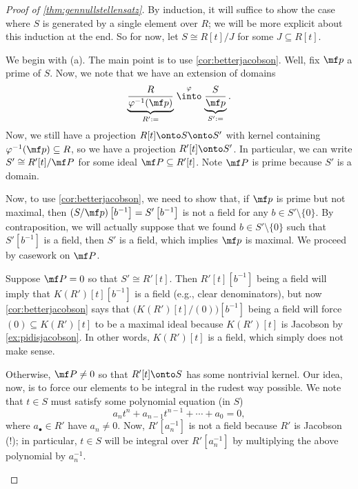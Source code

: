 \begin{proof}[Proof of \autoref{thm:gennullstellensatz}]
	By induction, it will suffice to show the case where $S$ is generated by a single element over $R$; we will be more explicit about this induction at the end.
	So for now, let $S\cong R[t]/J$ for some $J\subseteq R[t]$.

	We begin with (a). The main point is to use \autoref{cor:betterjacobson}. Well, fix $\mf p$ a prime of $S$. Now, we note that we have an extension of domains
	\[\underbrace{\frac R{\varphi^{-1}(\mf p)}}_{R':=}\stackrel\varphi\into\underbrace{\frac S{\mf p}}_{S':=}.\]
	Now, we still have a projection $R[t]\onto S\onto S'$ with kernel containing $\varphi^{-1}(\mf p)\subseteq R$, so we have a projection $R'[t]\onto S'$. In particular, we can write $S'\cong R'[t]/\mf P$ for some ideal $\mf P\subseteq R'[t]$. Note $\mf P$ is prime because $S'$ is a domain.
	
	Now, to use \autoref{cor:betterjacobson}, we need to show that, if $\mf p$ is prime but not maximal, then $(S/\mf p)\left[b^{-1}\right]=S'\left[b^{-1}\right]$ is not a field for any $b\in S'\setminus\{0\}$. By contraposition, we will actually suppose that we found $b\in S'\setminus\{0\}$ such that $S'\left[b^{-1}\right]$ is a field, then $S'$ is a field, which implies $\mf p$ is maximal. We proceed by casework on $\mf P$.
	\begin{listroman}
		\item Suppose $\mf P=0$ so that $S'\cong R'[t]$. Then $R'[t]\left[b^{-1}\right]$ being a field will imply that $K(R')[t]\left[b^{-1}\right]$ is a field (e.g., clear denominators), but now \autoref{cor:betterjacobson} says that $\big(K(R')[t]/(0)\big)\left[b^{-1}\right]$ being a field will force $(0)\subseteq K(R')[t]$ to be a maximal ideal because $K(R')[t]$ is Jacobson by \autoref{ex:pidisjacobson}. In other words, $K(R')[t]$ is a field, which simply does not make sense.\todo{}

		\item Otherwise, $\mf P\ne0$ so that $R'[t]\onto S$ has some nontrivial kernel. Our idea, now, is to force our elements to be integral in the rudest way possible. We note that $t\in S$ must satisfy some polynomial equation (in $S$)
		\[a_nt^n+a_{n-1}t^{n-1}+\cdots+a_0=0,\]
		where $a_\bullet\in R'$ have $a_n\ne0$. Now, $R'\left[a_n^{-1}\right]$ is not a field because $R'$ is Jacobson (!); in particular, $t\in S$ will be integral over $R'\left[a_n^{-1}\right]$ by multiplying the above polynomial by $a_n^{-1}$.
		

\end{listroman}
\end{proof}
